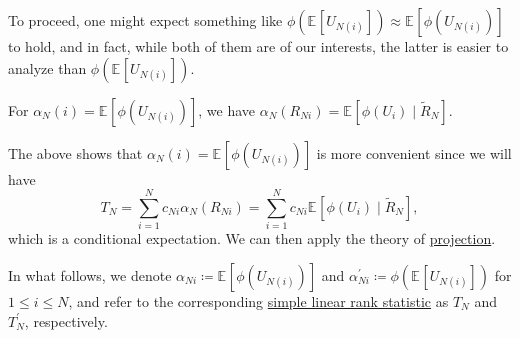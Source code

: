 To proceed, one might expect something like \(\phi (\mathbb{E}_{}[U_{N(i)}] ) \approx \mathbb{E}_{}[\phi (U_{N(i)})] \) to hold, and in fact, while both of them are of our interests, the latter is easier to analyze than \(\phi (\mathbb{E}_{}[U_{N(i)}] )\).

\begin{intuition}
	For \(\alpha _N(i) = \mathbb{E}_{}[\phi (U_{N(i)})]\), we have \(\alpha _N(R_{Ni}) = \mathbb{E}_{}[\phi (U_i) \mid \widetilde{R} _N]\).
\end{intuition}

The above shows that \(\alpha _N(i) = \mathbb{E}_{}[\phi (U_{N(i)})]\) is more convenient since we will have
\[
	T_N
	= \sum_{i=1}^{N} c_{Ni} \alpha _N(R_{Ni})
	= \sum_{i=1}^{N} c_{Ni} \mathbb{E}_{}[\phi (U_i) \mid \widetilde{R} _N] ,
\]
which is a conditional expectation. We can then apply the theory of \hyperref[def:projection]{projection}.

\begin{notation}
	In what follows, we denote \(\alpha _{Ni} \coloneqq \mathbb{E}_{}[\phi (U_{N(i)})] \) and \(\alpha _{Ni}^{\prime} \coloneqq \phi (\mathbb{E}_{}[U_{N(i)}] )\) for \(1 \leq i \leq N\), and refer to the corresponding \hyperref[def:simple-linear-rank-statistic]{simple linear rank statistic} as \(T_N\) and \(T_N^{\prime} \), respectively.
\end{notation}